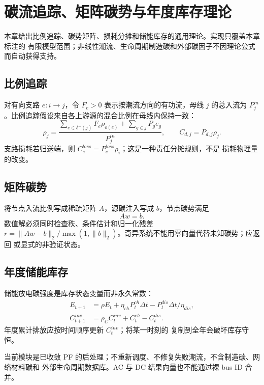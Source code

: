\section{碳流追踪、矩阵碳势与年度库存理论}\label{sec:carbon-theory}

\begin{theorynote}
本章给出比例追踪、碳势矩阵、损耗分摊和储能库存的通用理论。实现只覆盖本章标注的
有限模型范围；非线性潮流、生命周期制造碳和外部碳因子不因理论公式而自动获得支持。
\end{theorynote}

\subsection{比例追踪}
对有向支路 $e:i\to j$，令 $F_e>0$ 表示按潮流方向的有功流，母线 $j$ 的总入流为
$P_j^{in}$。比例追踪假设来自各上游源的混合比例在母线内保持一致：
\begin{equation}
\rho_j=\frac{\sum_{e\in\delta^-(j)}F_e\rho_{o(e)}+\sum_{g\in j}P_ge_g}{P_j^{in}},
\qquad C_{d,j}=P_{d,j}\rho_j.
\end{equation}
支路损耗若归送端，则 $C_e^{loss}=P_e^{loss}\rho_{i}$；这是一种责任分摊规则，不是
损耗物理量的改变。

\subsection{矩阵碳势}
将节点入流比例写成稀疏矩阵 $A$，源碳注入写成 $b$，节点碳势满足
\begin{equation}Aw=b.
\end{equation}
数值解必须同时检查秩、条件估计和归一化残差
$r=\|Aw-b\|_2/\max(1,\|b\|_2)$。奇异系统不能用零向量代替未知碳势；应返回
 或显式的非验证状态。

\subsection{年度储能库存}
储能放电碳强度是库存状态变量而非永久常数：
\begin{align}
E_{t+1}&=\rho E_t+\eta_{ch}P_t^{ch}\Delta t-P_t^{dis}\Delta t/\eta_{dis},\\
C_{t+1}^{inv}&=\rho_C C_t^{inv}+C_t^{ch}-C_t^{dis}.
\end{align}
年度累计排放应按时间顺序更新 $C_t^{inv}$；将某一时刻的
 复制到全年会破坏库存守恒。

\begin{gapnote}
当前模块是已收敛 PF 的后处理；不重新调度、不修复失败潮流，不含制造碳、网络材料碳和
外部生命周期数据库。AC 与 DC 结果向量也不能通过裸 bus ID 合并。
\end{gapnote}

